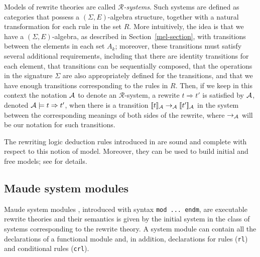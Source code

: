 Models of rewrite theories are called \emph{$\mathcal{R}$-systems}.
Such systems are defined as categories that possess a
$(\Sigma,E)$-algebra structure, together with a natural transformation
for each rule in the set $R$. More intuitively, the idea is that we have a
$(\Sigma,E)$-algebra, as described in Section~\ref{mel-section}, with
transitions between the elements in each set $A_k$; moreover, these
transitions must satisfy several additional requirements, including that
there are identity transitions for each element, that transitions can
be sequentially composed, that the operations in the signature $\Sigma$
are also appropriately defined for the transitions, and that we have
enough transitions corresponding to the rules in $R$. Then, if we keep in
this context the notation $\mathcal{A}$ to denote an $\mathcal{R}$-system, a
rewrite $t \Rightarrow t'$ is satisfied by $\mathcal{A}$, 
denoted $\mathcal{A} \models t \Rightarrow t'$, when there is a transition
$[\![t]\!]_{\mathcal{A}} \rightarrow_{\mathcal{A}} [\![t']\!]_{\mathcal{A}}$ in the system between the
corresponding meanings of both sides of the rewrite, where $\rightarrow_{\mathcal{A}}$
will be our notation for such transitions. 

The rewriting logic deduction rules introduced in \cite{Meseguer92-tcs}
are sound and complete with respect to this notion of model. Moreover,
they can be used to build initial and free models; see \cite{Meseguer92-tcs}
for details.

\subsection{Maude system modules}

Maude system modules \cite[Chapter 6]{maude-book}, introduced with
syntax \texttt{mod ...\ endm}, are executable rewrite 
theories and their semantics is given by the initial system in the class of 
systems corresponding to the rewrite theory.  A system module can contain all the
declarations of a functional module and, in addition, declarations for
rules (\texttt{rl}) and conditional rules (\texttt{crl}).

